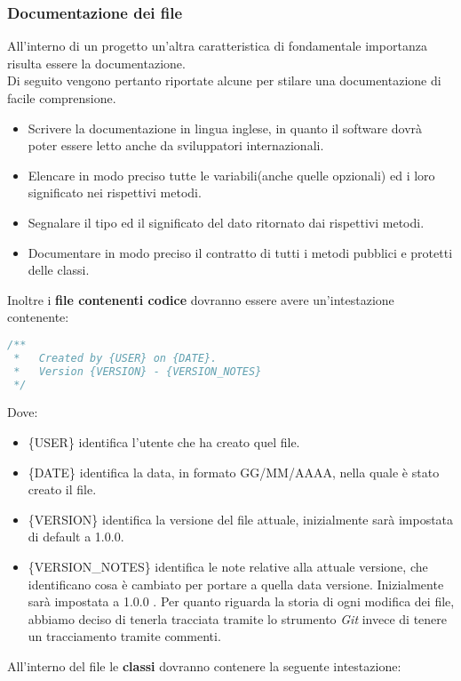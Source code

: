 \subsubsection{Documentazione dei file}
All'interno di un progetto  un'altra caratteristica di fondamentale importanza risulta essere la documentazione. \\
Di seguito vengono pertanto riportate alcune  per stilare una documentazione di facile comprensione.

\begin{itemize}
\item Scrivere la documentazione in lingua inglese, in quanto il software dovrà poter essere letto anche da sviluppatori internazionali.
\item Elencare in modo preciso tutte le variabili(anche quelle opzionali) ed i loro significato nei rispettivi metodi.
\item Segnalare il tipo ed il significato del dato ritornato dai rispettivi metodi.
\item Documentare in modo preciso il contratto di tutti i metodi pubblici e protetti delle classi.
\end{itemize}
Inoltre i \textbf{file contenenti codice} dovranno essere avere un’intestazione contenente:

\begin{lstlisting}[language=JavaScript]
/** 
 *   Created by {USER} on {DATE}.
 *   Version {VERSION} - {VERSION_NOTES}
 */
\end{lstlisting}
Dove:
\begin{itemize}
\item \{USER\} identifica l'utente che ha creato quel file.
\item \{DATE\} identifica la data, in formato GG/MM/AAAA, nella quale è stato creato il file.
\item \{VERSION\} identifica la versione del file attuale, inizialmente sarà impostata di default a 1.0.0.
\item \{VERSION\_NOTES\} identifica le note relative alla attuale versione, che identificano cosa è cambiato per portare a quella data versione. Inizialmente sarà impostata a 1.0.0 .
Per quanto riguarda la storia di ogni modifica dei file, abbiamo deciso di tenerla tracciata tramite lo strumento \textit{Git} invece di tenere un tracciamento tramite commenti.
\end{itemize}



All'interno del file le \textbf{classi} dovranno contenere la seguente intestazione:

